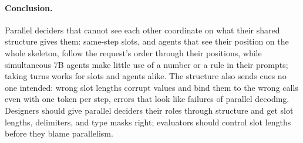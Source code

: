 \paragraph{Conclusion.} Parallel deciders that cannot see each other coordinate on what their shared structure gives them: same-step slots, and \dream agents that see their position on the whole skeleton, follow the request's order through their positions, while simultaneous 7B agents make little use of a number or a rule in their prompts; taking turns works for slots and agents alike. The structure also sends cues no one intended: wrong slot lengths corrupt values and bind them to the wrong calls even with one token per step, errors that look like failures of parallel decoding. Designers should give parallel deciders their roles through structure and get slot lengths, delimiters, and type masks right; evaluators should control slot lengths before they blame parallelism.
